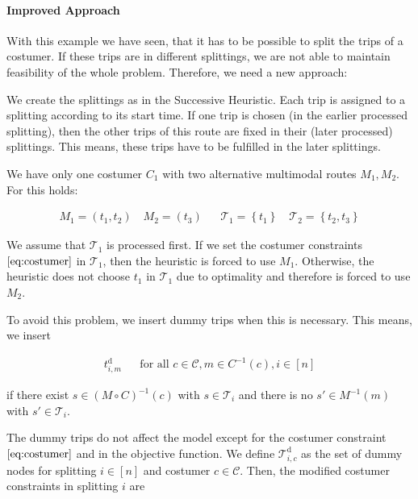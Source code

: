 \paragraph{Improved Approach} \parfill

With this example we have seen, that it has to be possible to split the trips of a costumer. If these trips are in different splittings, we are not able to maintain feasibility of the whole problem. Therefore, we need a new approach: 

We create the splittings as in the Successive Heuristic. Each trip is assigned to a splitting according to its start time. If one trip is chosen (in the earlier processed splitting), then the other trips of this route are fixed in their (later processed) splittings. This means, these trips have to be fulfilled in the later splittings.

\begin{example}

We have only one costumer $C_1$ with two alternative multimodal routes $M_1, M_2$. For this holds:

\begin{align*}
	M_1=\left(t_1,t_2\right) \quad M_2=\left(t_3\right) & & \mathcal{T}_1=\left\{t_1\right\} \quad \mathcal{T}_2=\left\{t_2,t_3\right\}
\end{align*}

We assume that $\mathcal{T}_1$ is processed first. If we set the costumer constraints $\eqref{eq:costumer}$ in $\mathcal{T}_1$, then the heuristic is forced to use $M_1$. Otherwise, the heuristic does not choose $t_1$ in $\mathcal{T}_1$ due to optimality and therefore is forced to use $M_2$.

\end{example}

To avoid this problem, we insert dummy trips when this is necessary. This means, we insert

\begin{align*}
	t^{\operatorname{d}}_{i,m} & & \text{for all } c\in\mathcal{C}, m\in C^{-1}(c), i \in[n]
\end{align*}

if there exist $s\in(M\circ C)^{-1}(c)$ with $s\in\mathcal{T}_i$ and there is no $s'\in M^{-1}(m)$ with $s'\in\mathcal{T}_i$. 

The dummy trips do not affect the model except for the costumer constraint $\eqref{eq:costumer}$ and in the objective function. We define $\mathcal{T}^{\operatorname{d}}_{i,c}$ as the set of dummy nodes for splitting $i\in[n]$ and costumer $c\in\mathcal{C}$. Then, the modified costumer constraints in splitting $i$ are

